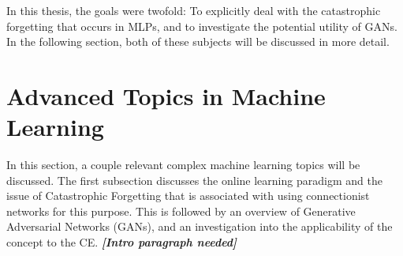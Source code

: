 	\par In this thesis, the goals were twofold: To explicitly deal with the catastrophic forgetting that occurs in MLPs, and to investigate the potential utility of GANs. In the following section, both of these subjects will be discussed in more detail.
	
	\section{Advanced Topics in Machine Learning}
	\par In this section, a couple relevant complex machine learning topics will be discussed. The first subsection discusses the online learning paradigm and the issue of Catastrophic Forgetting that is associated with using connectionist networks for this purpose. This is followed by an overview of Generative Adversarial Networks (GANs), and an investigation into the applicability of the concept to the CE.
	 \textbf{\textit{[Intro paragraph needed]}}
